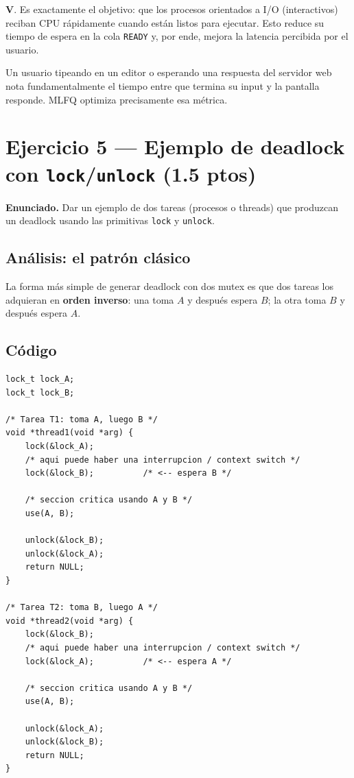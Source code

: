 \documentclass[11pt,a4paper]{article}
\begin{document}
\begin{respuesta}
\textbf{V}. Es exactamente el objetivo: que los procesos
orientados a I/O (interactivos) reciban CPU rápidamente cuando
están listos para ejecutar. Esto reduce su tiempo de espera en la
cola \texttt{READY} y, por ende, mejora la latencia percibida por el
usuario.

Un usuario tipeando en un editor o esperando una respuesta del
servidor web nota fundamentalmente el tiempo entre que termina su
input y la pantalla responde. MLFQ optimiza precisamente esa métrica.
\end{respuesta}

\section{Ejercicio 5 --- Ejemplo de deadlock con \texttt{lock}/\texttt{unlock} (1.5 ptos)}

\textbf{Enunciado.} Dar un ejemplo de dos tareas (procesos o threads)
que produzcan un deadlock usando las primitivas \texttt{lock} y
\texttt{unlock}.

\subsection*{Análisis: el patrón clásico}

La forma más simple de generar deadlock con dos mutex es que dos
tareas los adquieran en \textbf{orden inverso}: una toma $A$ y
después espera $B$; la otra toma $B$ y después espera $A$.

\subsection*{Código}

\begin{lstlisting}[style=cstyle]
lock_t lock_A;
lock_t lock_B;

/* Tarea T1: toma A, luego B */
void *thread1(void *arg) {
    lock(&lock_A);
    /* aqui puede haber una interrupcion / context switch */
    lock(&lock_B);          /* <-- espera B */

    /* seccion critica usando A y B */
    use(A, B);

    unlock(&lock_B);
    unlock(&lock_A);
    return NULL;
}

/* Tarea T2: toma B, luego A */
void *thread2(void *arg) {
    lock(&lock_B);
    /* aqui puede haber una interrupcion / context switch */
    lock(&lock_A);          /* <-- espera A */

    /* seccion critica usando A y B */
    use(A, B);

    unlock(&lock_A);
    unlock(&lock_B);
    return NULL;
}
\end{lstlisting}
\end{document}
